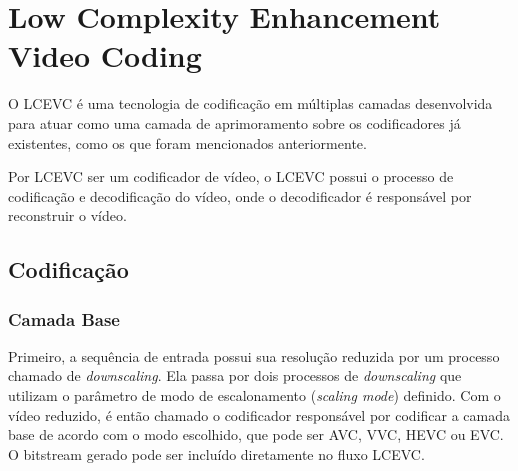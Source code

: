 


\section{Low Complexity Enhancement Video Coding}

O \acrshort{LCEVC} é uma tecnologia de codificação em múltiplas camadas desenvolvida para atuar
como uma camada de aprimoramento sobre os codificadores já existentes, como os que foram
mencionados anteriormente.

Por \acrshort{LCEVC} ser um codificador de vídeo, o \acrshort{LCEVC} possui o processo de
codificação e decodificação do vídeo, onde o decodificador é responsável por reconstruir o vídeo.

\subsection{Codificação}

%

\subsubsection{Camada Base}

Primeiro, a sequência de entrada possui sua resolução reduzida por um processo chamado de
\textit{downscaling}. Ela passa por dois processos de \textit{downscaling} que utilizam
o parâmetro de modo de escalonamento (\textit{scaling mode}) definido. Com o vídeo
reduzido, é então chamado o codificador responsável por codificar a camada base de acordo
com o modo escolhido, que pode ser \acrshort{AVC}, \acrshort{VVC}, \acrshort{HEVC} ou
\acrshort{EVC}. O bitstream gerado pode ser incluído diretamente no fluxo LCEVC. 
\cite{MPEG2022LCEVC, overview_lcevc}

